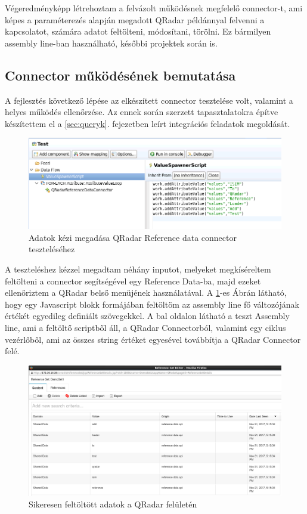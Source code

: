 Végeredményképp létrehoztam a felvázolt működésnek megfelelő connector-t, ami képes a paraméterezés alapján megadott QRadar példánnyal felvenni a kapcsolatot, számára adatot feltölteni, módosítani, törölni. Ez bármilyen assembly line-ban használható, későbbi projektek során is.

\subsection{Connector működésének bemutatása} \label{subsec:conntest}
A fejlesztés következő lépése az elkészített connector tesztelése volt, valamint a helyes működés ellenőrzése. Az ennek során szerzett tapasztalatokra építve készítettem el a \ref{sec:queryk}.  fejezetben leírt integrációs feladatok megoldását.

\begin{figure}[t]
	\centering	
	\includegraphics[width=1.0\linewidth]{figures/conn_test/connTest1}
	\caption{Adatok kézi megadása QRadar Reference data connector teszteléséhez}
	\label{fig:conntest1}
\end{figure}

A teszteléshez kézzel megadtam néhány inputot, melyeket megkíséreltem feltölteni a connector segítségével egy Reference Data-ba, majd ezeket ellenőriztem a QRadar belső menüjének használatával.
A  \ref{fig:conntest1}-es Ábrán látható, hogy egy Javascript blokk formájában feltöltöm az assembly line fő változójának értékét egyedileg definiált szövegekkel. A bal oldalon látható a teszt Assembly line, ami a feltöltő scriptből áll, a QRadar Connectorból, valamint egy ciklus vezérlőből, ami az összes string értéket egyesével továbbítja a QRadar Connector felé. 
 
 \begin{figure}
 	\centering
 	\includegraphics[width=1.0\linewidth]{figures/conn_test/qradarTest1}
 	\caption{Sikeresen feltöltött adatok a QRadar felületén}
 	\label{fig:qradartest1}
 \end{figure}
 

